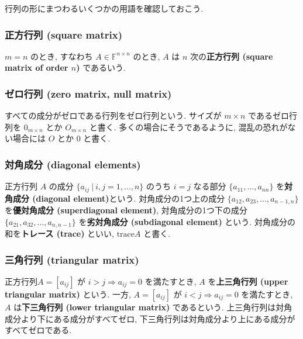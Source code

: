 \documentclass[a4paper]{scrbook}
\theoremstyle{definition}
\begin{document}
行列の形にまつわるいくつかの用語を確認しておこう.

\subsubsection*{正方行列 (square matrix)}\label{-square-matrix}

\(m=n\) のとき, すなわち \(A\in\mathbb{F}^{n\times n}\) のとき, \(A\) は
\(n\) 次の\textbf{正方行列 (square matrix of order \(n\))} であるいう.

\subsubsection*{ゼロ行列 (zero matrix, null
matrix)}\label{-zero-matrix-null-matrix}

すべての成分がゼロである行列をゼロ行列という. サイズが \(m\times n\)
であるゼロ行列を \(0_{m\times n}\) とか \(O_{m\times n}\) と書く.
多くの場合にそうであるように, 混乱の恐れがない場合には \(O\) とか \(0\)
と書く.

\subsubsection*{対角成分 (diagonal elements)}\label{-diagonal-elements}

正方行列 \(A\) の成分 \(\{a_{ij}\ |\ i,j=1,\dots,n\}\) のうち \(i=j\)
なる部分 \(\{a_{11},\dots,a_{nn}\}\) を\textbf{対角成分 (diagonal
element)}という. 対角成分の1つ上の成分
\(\{a_{12},a_{23},\dots,a_{n-1,n}\}\) を\textbf{優対角成分
(superdiagonal element)}, 対角成分の1つ下の成分
\(\{a_{21},a_{32},\dots,a_{n,n-1}\}\) を\textbf{劣対角成分 (subdiagonal
element)} という. 対角成分の和を\textbf{トレース (trace)} といい,
\(\mathrm{trace}A\) と書く.

\subsubsection*{三角行列 (triangular matrix)}\label{-triangular-matrix}

正方行列\(A=[a_{ij}]\) が \(i>j\Rightarrow a_{ij}=0\) を満たすとき,
\(A\) を\textbf{上三角行列 (upper triangular matrix)} という. 一方,
\(A=[a_{ij}]\) が \(i<j\Rightarrow a_{ij}=0\) を満たすとき, \(A\)
は\textbf{下三角行列 (lower triangular matrix)} であるという.
上三角行列は対角成分より下にある成分がすべてゼロ,
下三角行列は対角成分より上にある成分がすべてゼロである.
\end{document}
